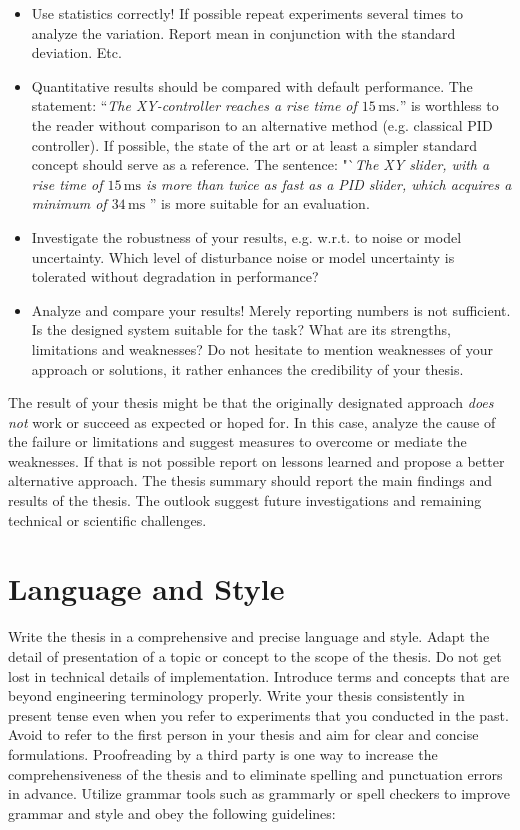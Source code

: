 \begin{itemize}
	\item Use statistics correctly! If possible repeat experiments several times to analyze the variation. Report mean in conjunction with the standard deviation. Etc.
	\item Quantitative results should be compared with default performance. The statement: "`\emph{The XY-controller reaches a rise time of $15\,\mathrm{ms}$.}"' is worthless to the reader without comparison to an alternative method (e.g. classical PID controller). If possible, the state of the art or at least a simpler standard concept should serve as a reference. The sentence: "`\emph{The XY slider, with a rise time of $15\,\mathrm{ms}$ is more than twice as fast as a PID slider, which acquires a minimum of $34\,\mathrm{ms}$ } '' is more suitable for an evaluation.
	\item Investigate the robustness of your results, e.g. w.r.t. to noise or model uncertainty. Which level of disturbance noise or model uncertainty is tolerated without degradation in performance?
	\item Analyze and compare your results! Merely reporting numbers is not sufficient. Is the designed system suitable for the task? What are its strengths, limitations and weaknesses? Do not hesitate to mention weaknesses of your approach or solutions, it rather enhances the credibility of your thesis.
\end{itemize}

The result of your thesis might be that the originally designated approach  \emph{does not} work or succeed as expected or hoped for.
In this case, analyze the cause of the failure or limitations and suggest measures to overcome or mediate the weaknesses. If that is not possible report on lessons learned and propose a better alternative approach.
The thesis summary should report the main findings and results of the thesis.
The outlook suggest future investigations and remaining technical or scientific challenges.



\section{Language and Style}
\label{hinweise:sprache}

Write the thesis in a comprehensive and precise language and style. 
Adapt the detail of presentation of a topic or concept to the scope of the thesis.
Do not get lost in technical details of implementation.
Introduce terms and concepts that are beyond engineering terminology properly.
Write your thesis consistently in present tense even when you refer to experiments
that you conducted in the past.
Avoid to refer to the first person in your thesis and aim for clear and concise formulations.
Proofreading by a third party is one way to increase the comprehensiveness of the thesis and to eliminate spelling and punctuation errors in advance. Utilize grammar tools such as grammarly or spell checkers to improve grammar and style and obey the following
guidelines:


